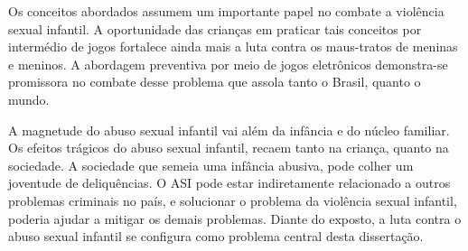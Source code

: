\begin{parcolumns}{3}


\end{parcolumns}

Os conceitos abordados assumem um importante papel no combate a violência sexual infantil. A oportunidade das crianças em praticar tais conceitos por intermédio de jogos fortalece ainda mais a luta contra os maus-tratos de meninas e meninos. A abordagem preventiva por meio de jogos eletrônicos demonstra-se promissora no combate desse problema que assola tanto o Brasil, quanto o mundo. 


A magnetude do abuso sexual infantil vai além da infância e do núcleo familiar. Os efeitos trágicos do abuso sexual infantil, recaem tanto na criança, quanto na sociedade. A sociedade que semeia uma infância abusiva, pode colher um joventude de deliquências. O ASI pode estar indiretamente relacionado a outros problemas criminais no país, e solucionar o problema da violência sexual infantil, poderia ajudar a mitigar os demais problemas. Diante do exposto, a luta contra o abuso sexual infantil se configura como problema central desta dissertação.  %




